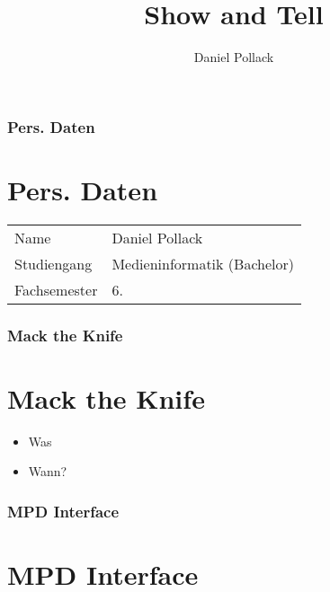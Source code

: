 \documentclass{beamer}
\title{Show and Tell}
\author{Daniel Pollack}
\begin{document}
\begin{frame}
	\maketitle
\end{frame}

\begin{frame}
	\tableofcontents
\end{frame}

\begin{frame}
	\frametitle{Pers. Daten}
	\section{Pers. Daten}

	\centering
	\begin{tabular}{ll}
		Name & Daniel Pollack\\
		Studiengang & Medieninformatik (Bachelor)\\
		Fachsemester & 6.
	\end{tabular}
\end{frame}

\begin{frame}
	\frametitle{Mack the Knife}
	\section{Mack the Knife}

	\begin{itemize}
	\item Was
	  \subitem
	\item Wann?
	\end{itemize}

\end{frame}

\begin{frame}
	\frametitle{MPD Interface}
	\section{MPD Interface}

\end{frame}
\end{document}
